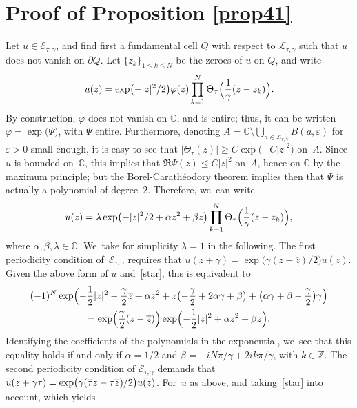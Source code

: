 \documentclass[JEP,XML,SOM,Unicode,NoFloatCountersInSection,published]{cedram}
\theoremstyle{definition}
\let\eps\varepsilon
\let\EE\exp
\let\dis\relax
\let\ov\overline
\newcommand{\bpa}[1]{\bigl(#1\bigr)}
\begin{document}
\section{Proof of Proposition \ref{prop41}}

\label{App1}
Let $u \in \mathcal{E}_{\tau,\gamma}$, and find first a fundamental cell $Q$ with respect to $\mathcal{L}_{\tau, \gamma}$ such that $u$ does not vanish on $\partial Q$. Let $\{ z_k \}_{1\leq k\leq N}$ be the zeroes of $u$ on $Q$, and write\vspace*{-3pt}
\[
\dis u(z) = \EE\bigl(-|z|^2/2 \bigr) \varphi(z) \prod_{k=1}^N \Theta_{\tau}\Bigl(\frac{1}{\gamma}(z-z_{k})\Bigr).
\]
By construction, $\varphi$ does not vanish on $\mathbb{C}$, and is entire; thus, it can be written $\varphi = \EE\bigl(\Psi\bigr)$, with $\Psi$ entire. Furthermore, denoting $A = \mathbb{C} \setminus \bigcup_{a \in \mathcal{L}_{\tau,\gamma}} B(a,\eps)$ for $\eps>0$ small enough, it is easy to see that $|\Theta_\tau(z)| \geq C \EE\bigl({-C|z|^2}\bigr)$ on~$A$. Since $u$ is bounded on~$\mathbb{C}$, this implies that $\Re \Psi (z) \leq C |z|^2$ on~$A$, hence on $\mathbb{C}$ by the maximum principle; but the Borel-Carathéodory theorem implies then that $\Psi$ is actually a polynomial of degree~2. Therefore, we~can write\vspace*{-3pt}
\begin{equation}\label{eqA1}
\dis u(z) = \lambda \EE\bigl({-|z|^2/2 + \alpha z^2 + \beta z}\bigr) \prod_{k=1}^N\Theta_{\tau}\Bigl(\frac{1}{\gamma}(z-z_{k})\Bigr),
\end{equation}
where $\alpha,\beta,\lambda \in \mathbb{C}$. We~take for simplicity $\lambda =1$ in the following. The first periodicity condition of~$\mathcal{E}_{\tau,\gamma}$ requires that $u(z+\gamma) = \EE\bigl({\gamma}(z-\overline{z})/2\bigr) u(z)$. Given the above form of $u$ and~\eqref{star}, this is equivalent to\vspace*{-3pt}
\begin{multline*}
(-1)^N \EE\Bigl(-\frac{1}{2}|z|^2 - \frac{\gamma}{2} \ov{z} + \alpha z^2 + z\bpa{-\frac{\gamma}{2} + 2 \alpha \gamma+ \beta} + \bpa{\alpha \gamma+ \beta - \frac{\gamma}{2}}\gamma \Bigr) \\
= \EE\Bigl(\frac{\gamma}{2}(z-\ov{z})\Bigr) \EE\Bigl({-\frac{1}{2}|z|^2+\alpha z^2 + \beta z}\Bigr).
\end{multline*}
Identifying the coefficients of the polynomials in the exponential, we~see that this equality holds if and only if $\alpha = 1/2$ and $\beta = -{iN\pi}/{\gamma} + {2ik\pi}/{\gamma}$, with $k \in \mathbb{Z}$. The second periodicity condition of $\mathcal{E}_{\tau,\gamma}$ demands that $\dis u(z+\gamma\tau) = \EE\bigl({{\gamma}(\ov{\tau}z-\tau \ov{z})/2}\bigr)u(z)$. For~$u$ as above, and taking~\eqref{star} into account, which yields\vspace*{-3pt}
\end{document}
